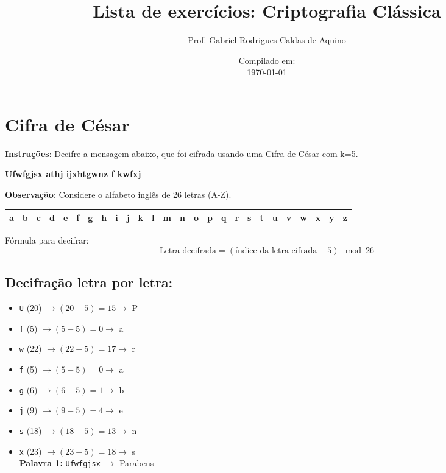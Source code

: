 \title{Lista de exercícios: Criptografia Clássica}
\author{Prof. Gabriel Rodrigues Caldas de Aquino}
\date{Compilado em: \\ \today}



\maketitle

\section{Cifra de César}

\textbf{Instruções}:
Decifre a mensagem abaixo, que foi cifrada usando uma Cifra de César com k=5.

\textbf{Ufwfgjsx athj ijxhtgwnz f kwfxj}

\textbf{Observação}: Considere o alfabeto inglês de 26 letras (A-Z).


\begin{table}[h]
    \centering
    \begin{tabular}{|*{26}{c|}}
        \hline
        a & b & c & d & e & f & g & h & i & j & k & l & m & n & o & p & q & r & s & t & u & v & w & x & y & z \\

        \hline
    \end{tabular}
\end{table}

Fórmula para decifrar:
\[
    \text{Letra decifrada} = (\text{índice da letra cifrada} - 5) \mod 26
\]

\subsection*{Decifração letra por letra:}

\begin{itemize}
    \item \texttt{U} (20) \(\rightarrow (20 - 5) = 15 \rightarrow\) P
    \item \texttt{f} (5) \(\rightarrow (5 - 5) = 0 \rightarrow\) a
    \item \texttt{w} (22) \(\rightarrow (22 - 5) = 17 \rightarrow\) r
    \item \texttt{f} (5) \(\rightarrow (5 - 5) = 0 \rightarrow\) a
    \item \texttt{g} (6) \(\rightarrow (6 - 5) = 1 \rightarrow\) b
    \item \texttt{j} (9) \(\rightarrow (9 - 5) = 4 \rightarrow\) e
    \item \texttt{s} (18) \(\rightarrow (18 - 5) = 13 \rightarrow\) n
    \item \texttt{x} (23) \(\rightarrow (23 - 5) = 18 \rightarrow\) s \\
          \textbf{Palavra 1:} \texttt{Ufwfgjsx} \(\rightarrow\) Parabens
\end{itemize}

